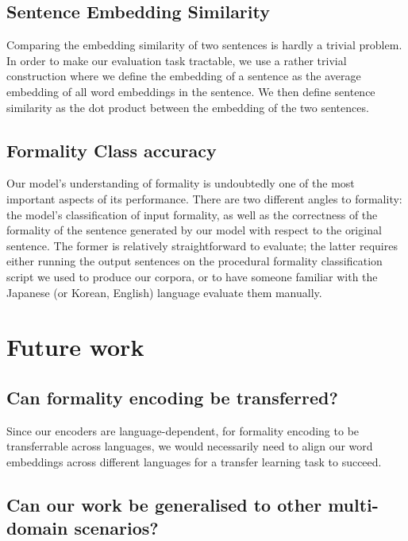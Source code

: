 \documentclass[11pt]{article}
\begin{document}
\subsection{Sentence Embedding Similarity}

Comparing the embedding similarity of two sentences is hardly a trivial problem. In order to make our evaluation task tractable, we use a rather trivial construction where we define the embedding of a sentence as the average embedding of all word embeddings in the sentence. We then define sentence similarity as the dot product between the embedding of the two sentences. 

\subsection{Formality Class accuracy}

Our model's understanding of formality is undoubtedly one of the most important aspects of its performance. There are two different angles to formality: the model's classification of input formality, as well as the correctness of the formality of the sentence generated by our model with respect to the original sentence. The former is relatively straightforward to evaluate; the latter requires either running the output sentences on the procedural formality classification script we used to produce our corpora, or to have someone familiar with the Japanese (or Korean, English) language evaluate them manually.

\section{Future work}

\subsection{Can formality encoding be transferred?}

Since our encoders are language-dependent, for formality encoding to be transferrable across languages, we would necessarily need to align our word embeddings across different languages for a transfer learning task to succeed. 

\subsection{Can our work be generalised to other multi-domain scenarios?}



\newpage
\printbibliography
\end{document}

